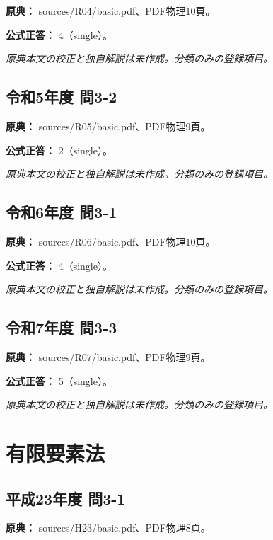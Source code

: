 \noindent\textbf{原典：} sources/R04/basic.pdf、PDF物理10頁。

\textbf{公式正答：} 4（single）。

\par\textit{原典本文の校正と独自解説は未作成。分類のみの登録項目。}

\subsection{令和5年度 問3-2}
\label{q:r05-reg-basic-3-2}

\noindent\textbf{原典：} sources/R05/basic.pdf、PDF物理9頁。

\textbf{公式正答：} 2（single）。

\par\textit{原典本文の校正と独自解説は未作成。分類のみの登録項目。}

\subsection{令和6年度 問3-1}
\label{q:r06-reg-basic-3-1}

\noindent\textbf{原典：} sources/R06/basic.pdf、PDF物理10頁。

\textbf{公式正答：} 4（single）。

\par\textit{原典本文の校正と独自解説は未作成。分類のみの登録項目。}

\subsection{令和7年度 問3-3}
\label{q:r07-reg-basic-3-3}

\noindent\textbf{原典：} sources/R07/basic.pdf、PDF物理9頁。

\textbf{公式正答：} 5（single）。

\par\textit{原典本文の校正と独自解説は未作成。分類のみの登録項目。}

\section{有限要素法}

\subsection{平成23年度 問3-1}
\label{q:h23-reg-basic-3-1}

\noindent\textbf{原典：} sources/H23/basic.pdf、PDF物理8頁。

